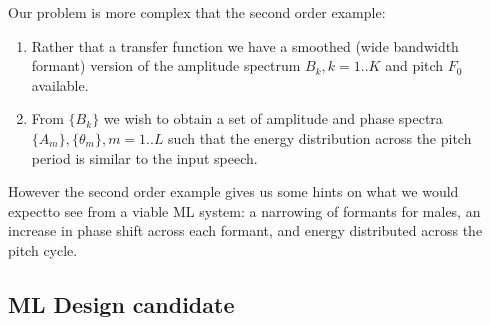 \documentclass{article}
\begin{document}
Our problem is more complex that the second order example:
\begin{enumerate}
\item Rather that a transfer function we have a smoothed (wide bandwidth formant) version of the amplitude spectrum $B_k,k=1..K$ and pitch $F_0$ available.
\item From $\{B_k\}$ we wish to obtain a set of amplitude and phase spectra $\{A_m\}, \{\theta_m\},m=1..L$ such that the energy distribution across the pitch period is similar to the input speech.
\end{enumerate}
However the second order example gives us some hints on what we would expectto see from a viable ML system: a narrowing of formants for males, an increase in phase shift across each formant, and energy distributed across the pitch cycle.


\subsection{ML Design candidate}
\end{document}
